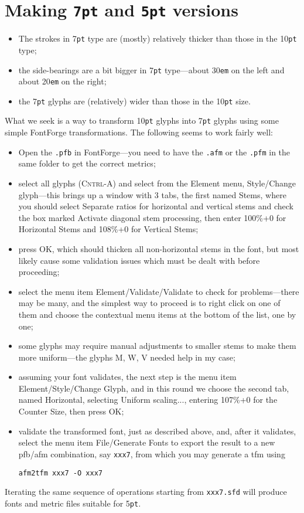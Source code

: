 \documentclass[10pt]{amsart}
\begin{document}
\section{Making {\tt7pt} and {\tt5pt} versions}
\begin{itemize}
\item
The strokes in 7{\tt pt} type are (mostly) relatively thicker than those in the 10{\tt pt} type;
\item the side-bearings are a bit bigger in 7{\tt pt} type---about 30{\tt em} on the left and about 20{\tt em} on the right;
\item the 7{\tt pt} glyphs are (relatively) wider than those in the 10{\tt pt} size. 
\end{itemize}
What we seek is a way to transform 10{\tt pt} glyphs into 7{\tt pt} glyphs using some simple FontForge transformations. The following seems to work fairly well:
\begin{itemize}
\item
Open the {\tt.pfb} in FontForge---you need to have the {\tt.afm} or the {\tt.pfm} in the same folder to get the correct metrics;
\item select all glyphs (\textsc{Cntrl}-A) and select from the Element menu, Style/Change glyph---this brings up a window with 3 tabs, the first named Stems, where you should select \textsf{Separate ratios for horizontal and vertical stems} and check the box marked \textsf{Activate diagonal stem processing}, then enter 100\%+0 for Horizontal Stems and 108\%+0 for Vertical Stems;
\item press \textsf{OK}, which should thicken all non-horizontal stems in the font, but most likely cause some validation issues which must be dealt with before proceeding;
\item select the menu item Element/Validate/Validate to check for problems---there may be many, and the simplest way to proceed is to right click on one of them and choose the contextual menu items at the bottom of the list, one by one;
\item some glyphs may require manual adjustments to smaller stems to make them more uniform---the glyphs M, W, V needed help in my case;
\item assuming your font validates, the next step is the menu item Element/Style/Change Glyph, and in this round we choose the second tab, named Horizontal, selecting \textsf{Uniform scaling...}, entering 107\%+0 for the Counter Size, then press \textsf{OK}; 
\item validate the transformed font, just as described above, and, after it validates, select the menu item \textsf{File/Generate Fonts} to export the result to a new pfb/afm combination, say {\tt xxx7}, from which you may generate a tfm using
\begin{verbatim}
afm2tfm xxx7 -O xxx7
\end{verbatim}
\end{itemize}
Iterating the same sequence of operations starting from {\tt xxx7.sfd} will produce fonts and metric files suitable for 5{\tt pt}. 
\end{document}
